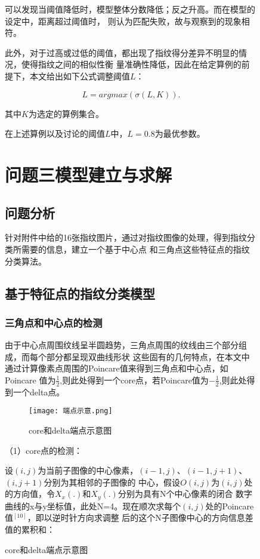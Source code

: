 \documentclass{whutmod}
\begin{document}
\begin{spacing}{1.2}
\begin{figure}[H]
可以发现当阈值降低时，模型整体分数降低；反之升高。而在模型的设定中，距离超过阈值时，
则认为匹配失败，故与观察到的现象相符。

此外，对于过高或过低的阈值，都出现了指纹得分差异不明显的情况，使得指纹之间的相似性衡
量准确性降低，因此在给定算例的前提下，本文给出如下公式调整阈值$L$：

$$L=argmax (\sigma (L,K)).$$

其中$K$为选定的算例集合。

在上述算例以及讨论的阈值$L$中，$L=0.8$为最优参数。


\clearpage

\section{问题三模型建立与求解}


\subsection{问题分析}
针对附件中给的16张指纹图片，通过对指纹图像的处理，得到指纹分类所需要的信息，建立一个基于中心点
和三角点这些特征点的指纹分类算法。



\subsection{基于特征点的指纹分类模型}

\subsubsection{三角点和中心点的检测}

由于中心点周围纹线呈半圆趋势，三角点周围的纹线由三个部分组成，而每个部分都呈现双曲线形状
这些固有的几何特点，在本文中通过计算像素点周围的Poincare值来得到三角点和中心点，如Poincare
值为$\frac{1}{2}$,则此处得到一个core点，若Poincare值为$-\frac{1}{2}$,则此处得到一个delta点。

\begin{figure}[H]
	\centering
	\texttt{[image: 端点示意.png]}
	\caption{core和delta端点示意图}
	\label{端点}
\end{figure}

（1）core点的检测：

设$(i,j)$为当前子图像的中心像素，$(i-1,j)$、$(i-1,j+1)$、$(i,j+1)$分别为其相邻的子图像的
中心，假设$O(i,j)$为$(i,j)$处的方向值，令$X_x(.)$和$X_y(.)$分别为具有N个中心像素的闭合
数字曲线的x与y坐标值，此处N=4。现在顺次求每个$(i,j)$处的Poincare值$^{[10]}$，即以逆时针方向求调整
后的这个N子图像中心的方向信息差值的累积和：




\end{figure}
\end{spacing}
\end{document}
